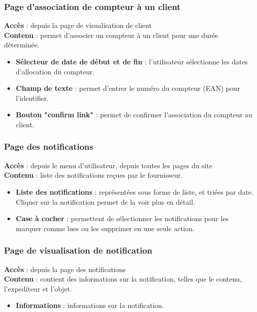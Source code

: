 \documentclass[../rapport.tex]{subfiles}
\begin{document}
\subsubsection{Page d'association de compteur à un client}
\noindent \textbf{Accès} :  depuis la page de visualisation de client\\
\textbf{Contenu }: permet d'associer un compteur à un client pour une durée déterminée.
\begin{itemize}
    \item \textbf{Sélecteur de date de début et de fin} : l'utilisateur sélectionne les dates d'allocation du compteur.
    \item \textbf{Champ de texte} : permet d'entrer le numéro du compteur (EAN) pour l'identifier.
    \item \textbf{Bouton "confirm link"} : permet de confirmer l'association du compteur au client.
\end{itemize}

\subsubsection{Page des notifications}
\noindent \textbf{Accès} :  depuis le menu d'utilisateur, depuis toutes les pages du site\\
\textbf{Contenu }: liste des notifications reçues par le fournisseur.
\begin{itemize}
    \item \textbf{Liste des notifications} : représentées sous forme de liste, et triées par date. Cliquer sur la notification permet de la voir plus en détail.
    \item \textbf{Case à cocher} : permettent de sélectionner les notifications pour les marquer comme lues ou les supprimer en une seule action.
\end{itemize}

\subsubsection{Page de visualisation de notification}
\noindent \textbf{Accès} :  depuis la page des notifications\\
\textbf{Contenu }: contient des informations sur la notification, telles que le contenu, l'expediteur et l'objet.
\begin{itemize}
    \item \textbf{Informations} : informations sur la notification.
\end{itemize}
\end{document}
